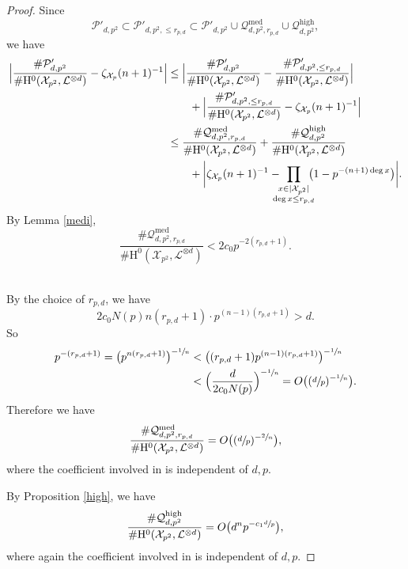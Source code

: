 \documentclass[JEP,XML,SOM,Unicode,published]{cedram}
\theoremstyle{plain}
\theoremstyle{definition}
\newcommand{\ho}{\mathrm{H}}
\newcommand{\X}{\mathcal{X}}
\newcommand{\li}{\mathcal{L}}
\begin{document}
\begin{proof}
Since
\[
\mathcal{P}'_{d,p^2}\subset \mathcal{P}'_{d,p^2,\leq r_{p,d}}\subset \mathcal{P}'_{d,p^2}\cup \mathcal{Q}^{\mathrm{med}}_{d,p^2,r_{p,d}}\cup \mathcal{Q}^{\mathrm{high}}_{d,p^2},
\]
we have
\begin{align*}
\Bigl| \frac{\#\mathcal{P}'_{d,p^2}}{\#\ho^0(\X_{p^2}, \li^{\otimes d})}-\zeta_{\X_p}(n+1)^{-1} \Bigr|
&\leq \Bigl| \frac{\#\mathcal{P}'_{d,p^2}}{\#\ho^0(\X_{p^2}, \li^{\otimes d})}-\frac{\#\mathcal{P}'_{d,p^2,\leq r_{p,d}}}{\#\ho^0(\X_{p^2}, \li^{\otimes d})} \Bigr|\\
&\hspace*{7mm}+\Bigl| \frac{\#\mathcal{P}'_{d,p^2,\leq r_{p,d}}}{\#\ho^0(\X_{p^2}, \li^{\otimes d})}-\zeta_{\X_p}(n+1)^{-1} \Bigr| \\
&\leq \frac{\#\mathcal{Q}^{\mathrm{med}}_{d,p^2,r_{p,d}}}{\#\ho^0(\X_{p^2}, \li^{\otimes d})} +\frac{\#\mathcal{Q}^{\mathrm{high}}_{d,p^2}}{\#\ho^0(\X_{p^2}, \li^{\otimes d})}\\
&\hspace*{7mm}+ \biggl| \zeta_{\X_p}(n+1)^{-1}-\hspace*{-3mm}\prod_{\substack{x\in |\X_{p^2}|\\ \deg x\leq r_{p,d}}}\hspace*{-2mm} \bigl(1-p^{-(n+1)\deg x} \bigr) \biggr|.
\end{align*}
By Lemma \ref{medi},
\[
\frac{\#\mathcal{Q}^{\mathrm{med}}_{d,p^2,r_{p,d}}}{\#\ho^0(\X_{p^2}, \li^{\otimes d})}<2c_0p^{-2(r_{p,d}+1)}.
\]
$ $

By the choice of $r_{p,d}$, we have
\[
2c_0N(p)n(r_{p,d}+1) \cdot p^{(n-1)(r_{p,d}+1)}>d.
\]
So
\begin{align*}
p^{-(r_{p,d}+1)}=\bigl(p^{n(r_{p,d}+1)} \bigr)^{-\sfrac{1}{n}}
&<\bigl((r_{p,d}+1)p^{(n-1)(r_{p,d}+1)} \bigr)^{-\sfrac{1}{n}}\\
&< \Bigl(\frac{d}{2c_0N(p)}\Bigr)^{-\sfrac{1}{n}}=O\bigl((\sfrac{d}{p})^{-\sfrac{1}{n}} \bigr).
\end{align*}
Therefore we have
\[
\frac{\#\mathcal{Q}^{\mathrm{med}}_{d,p^2,r_{p,d}}}{\#\ho^0(\X_{p^2}, \li^{\otimes d})}=O\bigl((\sfrac{d}{p})^{-\sfrac{2}{n}} \bigr),
\]
where the coefficient involved in is independent of $d,p$.

By Proposition \ref{high}, we have
\[
\frac{\#\mathcal{Q}_{d,p^2}^{\mathrm{high}}}{\#\ho^0(\X_{p^2}, \li^{\otimes d})}=O\bigl(d^{n}p^{-c_1\sfrac{d}{p}} \bigr),
\]
where again the coefficient involved in is independent of $d,p$.


\end{proof}
\end{document}
